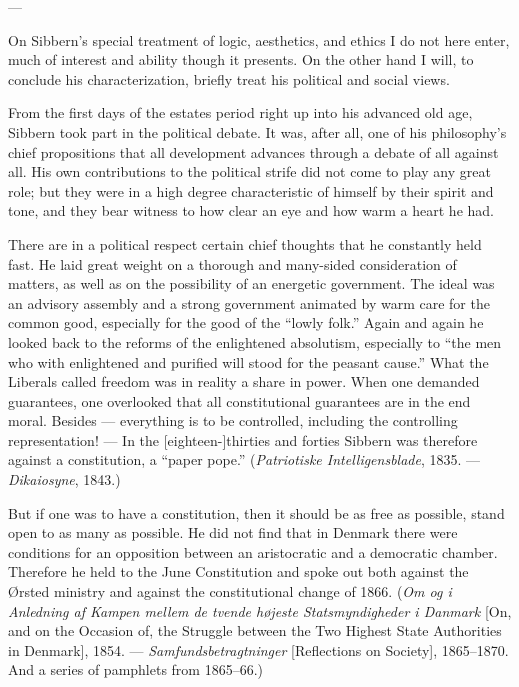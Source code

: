 \documentclass[12pt,a4paper]{book}
\newcommand{\opage}[1]{\marginnote{\footnotesize\textit{[#1]}}}
\begin{document}
\begin{center}---\end{center}

On Sibbern's special treatment of logic, aesthetics, and ethics I do not here enter, much of
interest and ability though it presents. On the other hand I will, to conclude his
characterization, briefly treat his political and social views.

From the first days of the estates period right up into his advanced old age, Sibbern took part
in the political debate. It was, after all, one of his philosophy's chief propositions that all
development advances through a debate of all against all. His own contributions to the political
strife did not come to play any great role; but they were in a high degree characteristic of
himself by their spirit and tone, and they bear witness to how clear an eye and how warm a heart
he had.

There are in a political respect certain chief thoughts that he constantly held fast. He laid
great weight on a thorough and many-sided consideration of matters, as well as on the possibility
of an energetic government. The ideal was an advisory assembly and a strong government animated by
warm care for the common good, especially for the good of the ``lowly folk.'' Again and again he
looked \opage{113}back to the reforms of the enlightened absolutism, especially to ``the men who with
enlightened and purified will stood for the peasant cause.'' What the Liberals called freedom was
in reality a share in power. When one demanded guarantees, one overlooked that all constitutional
guarantees are in the end moral. Besides --- everything is to be controlled, including the
controlling representation! --- In the [eighteen-]thirties and forties Sibbern was therefore
against a constitution, a ``paper pope.'' (\emph{Patriotiske Intelligensblade}, 1835. ---
\emph{Dikaiosyne}, 1843.)

But if one was to have a constitution, then it should be as free as possible, stand open to as
many as possible. He did not find that in Denmark there were conditions for an opposition between
an aristocratic and a democratic chamber. Therefore he held to the June Constitution and spoke out
both against the Ørsted ministry and against the constitutional change of 1866. (\emph{Om og i
Anledning af Kampen mellem de tvende højeste Statsmyndigheder i Danmark} [On, and on the Occasion
of, the Struggle between the Two Highest State Authorities in Denmark], 1854. ---
\emph{Samfundsbetragtninger} [Reflections on Society], 1865--1870. And a series of pamphlets from
1865--66.)
\end{document}
